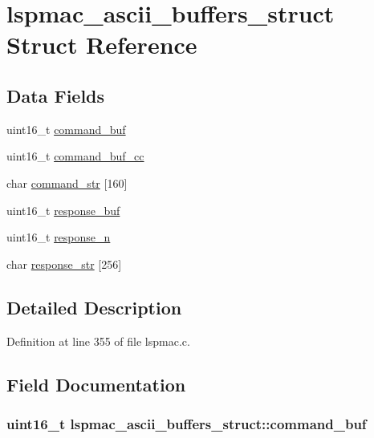 \hypertarget{structlspmac__ascii__buffers__struct}{\section{lspmac\-\_\-ascii\-\_\-buffers\-\_\-struct Struct Reference}
\label{structlspmac__ascii__buffers__struct}
}
\subsection*{Data Fields}
\begin{DoxyCompactItemize}
\item 
uint16\-\_\-t \hyperlink{structlspmac__ascii__buffers__struct_ad92fe7e16e5e67ec4c115a6b86890faa}{command\-\_\-buf}
\item 
uint16\-\_\-t \hyperlink{structlspmac__ascii__buffers__struct_a4d11efeb1eef407d811d3f9b774adc54}{command\-\_\-buf\-\_\-cc}
\item 
char \hyperlink{structlspmac__ascii__buffers__struct_abe6a433dd9be4781dbf7e31d16484a4b}{command\-\_\-str} \mbox{[}160\mbox{]}
\item 
uint16\-\_\-t \hyperlink{structlspmac__ascii__buffers__struct_ae1d37cf9568478c9d8dad540ce77183c}{response\-\_\-buf}
\item 
uint16\-\_\-t \hyperlink{structlspmac__ascii__buffers__struct_a97c2fdd21eec29c2cba993e361c3c069}{response\-\_\-n}
\item 
char \hyperlink{structlspmac__ascii__buffers__struct_a32c4baecf20143eb71d348b6b5679039}{response\-\_\-str} \mbox{[}256\mbox{]}
\end{DoxyCompactItemize}


\subsection{Detailed Description}


Definition at line 355 of file lspmac.\-c.



\subsection{Field Documentation}
\hypertarget{structlspmac__ascii__buffers__struct_ad92fe7e16e5e67ec4c115a6b86890faa}{
\subsubsection[{command\-\_\-buf}]{\setlength{\rightskip}{0pt plus 5cm}uint16\-\_\-t lspmac\-\_\-ascii\-\_\-buffers\-\_\-struct\-::command\-\_\-buf}}\label{structlspmac__ascii__buffers__struct_ad92fe7e16e5e67ec4c115a6b86890faa}


